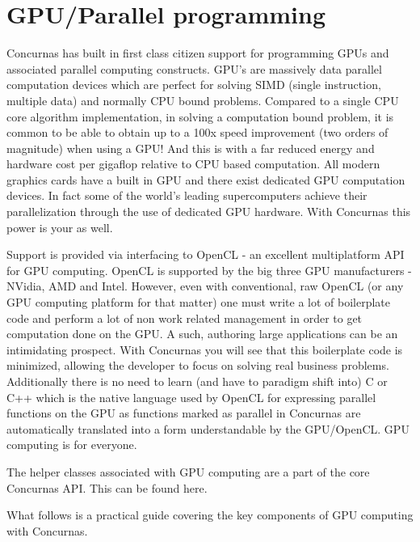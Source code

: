 \documentclass[conc-doc]{subfiles}
\begin{document}
	
	\chapter[GPU/Parallel programming]{GPU/Parallel programming}
	\label{ch:gpuprogramming}



Concurnas has built in first class citizen support for programming GPUs and associated parallel computing constructs. GPU's are massively data parallel computation devices which are perfect for solving SIMD (single instruction, multiple data) and normally CPU bound problems. Compared to a single CPU core algorithm implementation, in solving a computation bound problem, it is common to be able to obtain up to a 100x speed improvement (two orders of magnitude) when using a GPU! And this is with a far reduced energy and hardware cost per gigaflop relative to CPU based computation. All modern graphics cards have a built in GPU and there exist dedicated GPU computation devices. In fact some of the world's leading supercomputers achieve their parallelization through the use of dedicated GPU hardware. With Concurnas this power is your as well.

Support is provided via interfacing to OpenCL - an excellent multiplatform API for GPU computing. OpenCL is supported by the big three GPU manufacturers - NVidia, AMD and Intel. However, even with conventional, raw OpenCL (or any GPU computing platform for that matter) one must write a lot of boilerplate code and perform a lot of non work related management in order to get computation done on the GPU. A such, authoring large applications can be an intimidating prospect. With Concurnas you will see that this boilerplate code is minimized, allowing the developer to focus on solving real business problems. Additionally there is no need to learn (and have to paradigm shift into) C or C++ which is the native language used by OpenCL for expressing parallel functions on the GPU as functions marked as parallel in Concurnas are automatically translated into a form understandable by the GPU/OpenCL. GPU computing is for everyone.

The helper classes associated with GPU computing are a part of the core Concurnas API. This can be found here.

What follows is a practical guide covering the key components of GPU computing with Concurnas.
\end{document}
